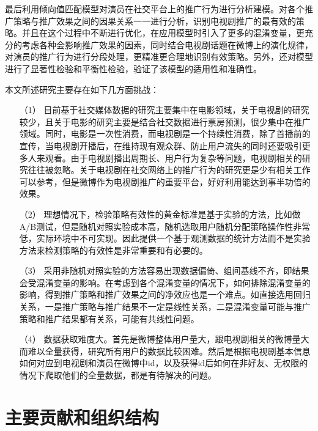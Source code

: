 最后利用倾向值匹配模型对演员在社交平台上的推广行为进行分析建模。对各个推广策略与推广效果之间的因果关系一一进行分析，识别电视剧推广的最有效的策略。并且在这个过程中不断进行优化，在应用模型时引入了更多的混淆变量，更充分的考虑各种会影响推广效果的因素，同时结合电视剧话题在微博上的演化规律，对演员的推广行为进行分段处理，更精准更合理地识别有效策略。另外，还对模型进行了显著性检验和平衡性检验，验证了该模型的适用性和准确性。

本文所述研究主要存在如下几方面挑战：

\begin{itemize}

\item[（1）]目前基于社交媒体数据的研究主要集中在电影领域，关于电视剧的研究较少，且关于电影的研究主要是结合社交数据进行票房预测，很少集中在推广领域。同时，电影是一次性消费，而电视剧是一个持续性消费，除了首播前的宣传，当电视剧开播后，在维持现有观众群、防止用户流失的同时还要吸引更多人来观看。由于电视剧播出周期长、用户行为复杂等问题，电视剧相关的研究往往被忽略。关于电视剧在社交网络上的推广行为的研究更是少有相关工作可以参考，但是微博作为电视剧推广的重要平台，好好利用能达到事半功倍的效果。

\item[（2）]理想情况下，检验策略有效性的黄金标准是基于实验的方法，比如做A/B测试，但是随机对照实验成本高，随机选取用户随机分配策略操作性非常低，实际环境中不可实现。因此提供一个基于观测数据的统计方法而不是实验方法来检测策略的有效性是非常重要和有必要的。

\item[（3）]采用非随机对照实验的方法容易出现数据偏倚、组间基线不齐，即结果会受混淆变量的影响。在考虑到各个混淆变量的情况下，如何排除混淆变量的影响，得到推广策略和推广效果之间的净效应也是一个难点。如直接选用回归关系，一是推广策略与推广结果不一定是线性关系，二是混淆变量可能与推广策略和推广结果都有关系，可能有共线性问题。

\item[（4）]数据获取难度大。首先是微博整体用户量大，跟电视剧相关的微博量大而难以全量获得，研究所有用户的数据比较困难。然后是根据电视剧基本信息如何对应到电视剧和演员在微博中id，以及获得id后如何在非好友、无权限的情况下爬取他们的全量数据，都是有待解决的问题。


\end{itemize}

\section{主要贡献和组织结构}


